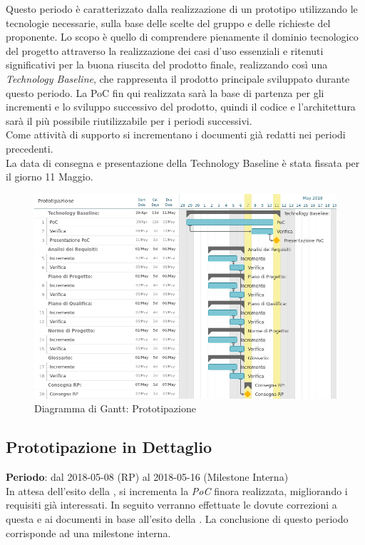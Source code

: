 Questo periodo è caratterizzato dalla realizzazione di un prototipo utilizzando le tecnologie necessarie, sulla base delle scelte del gruppo \Gruppo{} e delle richieste del proponente.
Lo scopo è quello di comprendere pienamente il dominio tecnologico del progetto attraverso la realizzazione dei casi d'uso essenziali e ritenuti significativi per la buona riuscita del prodotto finale, realizzando così una \emph{Technology Baseline}, che rappresenta il prodotto principale sviluppato durante questo periodo. La PoC fin qui realizzata sarà la base di partenza per gli incrementi e lo sviluppo successivo del prodotto, quindi il codice e l'architettura sarà il più possibile riutilizzabile per i periodi successivi.\\ 
Come attività di supporto si incrementano i documenti già redatti nei periodi precedenti.\\
La data di consegna e presentazione della Technology Baseline è stata fissata per il giorno 11 Maggio.

\begin{figure}[h!]
	\centerline{\includegraphics[scale=0.55]{img/DiagrammiGantt/Prototipazione.jpg}}
	\caption{Diagramma di Gantt: Prototipazione}
	\label{fig:gantt_prot}
\end{figure}
\clearpage

\subsection{Prototipazione in Dettaglio}
\textbf{Periodo}: dal 2018-05-08 (RP) al 2018-05-16 (Milestone Interna)\\

In attesa dell'esito della \RP{}, si incrementa la \emph{PoC} finora realizzata, migliorando i requisiti già interessati. In seguito verranno effettuate le dovute correzioni a questa e ai documenti in base all'esito della \RP{}. La conclusione di questo periodo corrisponde ad una milestone interna.

